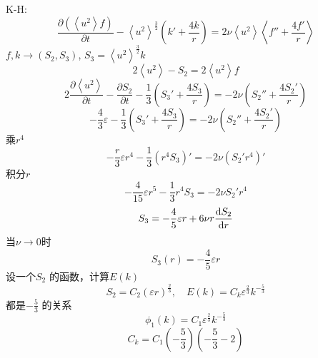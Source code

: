 \documentclass[12pt]{ctexart}
\begin{document}
K-H: 
\begin{equation}
   \frac{\partial \left( \left< u^2 \right> f \right) }{\partial t}  - \left< u^2 \right>^{\frac{3}{2}} \left( k' + \frac{4k}{r} \right) = 2\nu \left< u^2 \right> \left< f'' + \frac{4f'}{r} \right> 
\end{equation}
$f,k \to (S_2,S_3)$, $S_3 =  \left< u^2 \right>^{\frac{3}{2}}k$
\begin{equation}
   2\left< u^2 \right> -S_2 = 2\left< u^2 \right>  f
\end{equation}
\begin{equation}
   2 \frac{\partial \left< u^2 \right> }{\partial t} - \frac{\partial S_2}{\partial t} - \frac{1}{3} \left( S_3' + \frac{4S_3}{r} \right) = -2 \nu \left( S_2'' + \frac{4S_2'}{r} \right) 
\end{equation}
\begin{equation}
   -\frac{4}{3} \varepsilon - \frac{1}{3} \left( S_3' + \frac{4S_3}{r} \right) = -2 \nu \left( S_2'' + \frac{4S_2'}{r} \right) 
\end{equation}
乘$r^4$
\begin{equation}
   - \frac{r}{3} \varepsilon  r^4 - \frac{1}{3} \left( r^4 S_3 \right) ' = -2 \nu \left( S_2' r^4 \right) '
\end{equation}
积分$r$
\begin{equation}
   - \frac{4}{15} \varepsilon r^5 - \frac{1}{3} r^4 S_3 = -2 \nu S_2' r^4
\end{equation}
\begin{equation}
   S_3 = - \frac{4}{5} \varepsilon r + 6\nu r \frac{\dif S_2}{\dif r}
\end{equation}
当$\nu \to 0$时
\begin{equation}
   S_3(r) = - \frac{4}{5} \varepsilon r
\end{equation}
设一个$S_2$ 的函数，计算$E(k)$
\begin{equation}
   S_2 = C_2 \left( \varepsilon r \right)^{\frac{2}{3}},\quad E(k) = C_k \varepsilon^{\frac{2}{3}} k^{-\frac{5}{3}}
\end{equation}
都是$-\frac{5}{3}$ 的关系
\begin{equation}
   \phi_1(k) = C_1 \varepsilon^{\frac{2}{3}} k^{-\frac{5}{3}}
\end{equation}
\begin{equation}
   C_k = C_1 \left( -\frac{5}{3} \right) \left( - \frac{5}{3} - 2 \right) 
\end{equation}
\end{document}

